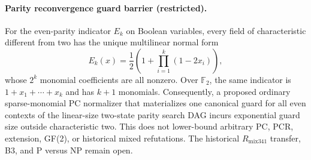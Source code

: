 \paragraph{Parity reconvergence guard barrier (restricted).}
For the even-parity indicator $E_k$ on Boolean variables, every field of
characteristic different from two has the unique multilinear normal form
\[
E_k(x)=\frac12\left(1+\prod_{i=1}^k(1-2x_i)\right),
\]
whose $2^k$ monomial coefficients are all nonzero.  Over $\mathbb F_2$,
the same indicator is $1+x_1+\cdots+x_k$ and has $k+1$ monomials.
Consequently, a proposed ordinary sparse-monomial PC normalizer that
materializes one canonical guard for all even contexts of the linear-size
two-state parity search DAG incurs exponential guard size outside
characteristic two.  This does not lower-bound arbitrary PC, PCR,
extension, GF(2), or historical mixed refutations.  The historical
$R_{\mathrm{mix341}}$ transfer, B3, and P versus NP remain open.
